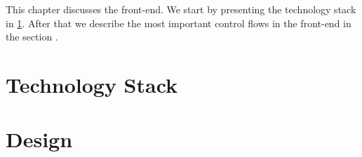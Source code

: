 This chapter discusses the front-end. We start by presenting the technology stack in \cref{sec:1:technologyStack}. After that we describe the most important control flows in the front-end in the section .

\section{Technology Stack}
\label{sec:1:technologyStack}
% 	

\section{Design}
\label{sec:1:design}
	